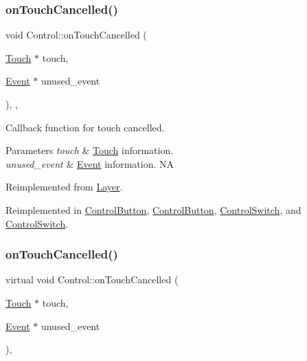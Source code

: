 \subsubsection{\texorpdfstring{on\+Touch\+Cancelled()}{onTouchCancelled()}\hspace{0.1cm}{\footnotesize\ttfamily [1/2]}}
{\footnotesize\ttfamily void Control\+::on\+Touch\+Cancelled (\begin{DoxyParamCaption}\item[{\hyperlink{classTouch}{Touch} $\ast$}]{touch,  }\item[{\hyperlink{classEvent}{Event} $\ast$}]{unused\+\_\+event }\end{DoxyParamCaption})\hspace{0.3cm}{\ttfamily [inline]}, {\ttfamily [override]}, {\ttfamily [virtual]}}

Callback function for touch cancelled.


\begin{DoxyParams}{Parameters}
{\em touch} & \hyperlink{classTouch}{Touch} information. \\
\hline
{\em unused\+\_\+event} & \hyperlink{classEvent}{Event} information.  NA \\
\hline
\end{DoxyParams}


Reimplemented from \hyperlink{classLayer_a9254f82e75c109b81c392d415ecf7b3d}{Layer}.



Reimplemented in \hyperlink{classControlButton_a32a7a37982d52d6660b532adabb8099e}{Control\+Button}, \hyperlink{classControlButton_a95558febae1ea6790245d093766ba20e}{Control\+Button}, \hyperlink{classControlSwitch_a31cc47f044081bb65d8490ac1b8900c0}{Control\+Switch}, and \hyperlink{classControlSwitch_aa4c6a2f3766e9916f0619a0249ddd7d7}{Control\+Switch}.

\mbox{\label{classControl_ab7fb8582f430d82180dbefea27c4cff9}} 
\subsubsection{\texorpdfstring{on\+Touch\+Cancelled()}{onTouchCancelled()}\hspace{0.1cm}{\footnotesize\ttfamily [2/2]}}
{\footnotesize\ttfamily virtual void Control\+::on\+Touch\+Cancelled (\begin{DoxyParamCaption}\item[{\hyperlink{classTouch}{Touch} $\ast$}]{touch,  }\item[{\hyperlink{classEvent}{Event} $\ast$}]{unused\+\_\+event }\end{DoxyParamCaption})\hspace{0.3cm}{\ttfamily [override]}, {\ttfamily [virtual]}}

